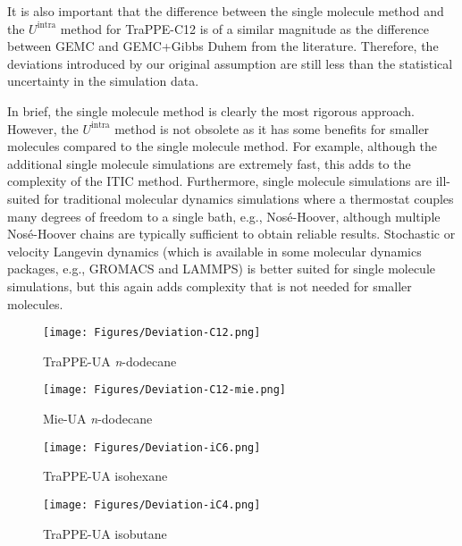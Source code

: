 \documentclass[%
 aip,
 jcp,
 sd,%
 amsmath,amssymb,
]{revtex4-1}
\begin{document}
It is also important that the difference between the single molecule method and the $U^\mathrm{intra}$ method for TraPPE-C12 is of a similar magnitude as the difference between GEMC and GEMC+Gibbs Duhem from the literature. Therefore, the deviations introduced by our original assumption are still less than the statistical uncertainty in the simulation data.

In brief, the single molecule method is clearly the most rigorous approach. However, the $U^\mathrm{intra}$ method is not obsolete as it has some benefits for smaller molecules compared to the single molecule method. For example, although the additional single molecule simulations are extremely fast, this adds to the complexity of the ITIC method. Furthermore, single molecule simulations are ill-suited for traditional molecular dynamics simulations where a thermostat couples many degrees of freedom to a single bath, e.g., Nos{\'e}-Hoover, although multiple Nos{\'e}-Hoover chains are typically sufficient to obtain reliable results. Stochastic or velocity Langevin dynamics (which is available in some molecular dynamics packages, e.g., GROMACS and LAMMPS) is better suited for single molecule simulations, but this again adds complexity that is not needed for smaller molecules. 
 
\begin{figure*}
\centering
\texttt{[image: Figures/Deviation-C12.png]}
\caption{
TraPPE-UA \textit{n}-dodecane
}
\label{fig:Deviation-C12}
\end{figure*}

\begin{figure*}
\centering
\texttt{[image: Figures/Deviation-C12-mie.png]}
\caption{
Mie-UA \textit{n}-dodecane
}
\label{fig:Deviation-C12-mie}
\end{figure*}

\begin{figure*}
\centering
\texttt{[image: Figures/Deviation-iC6.png]}
\caption{
TraPPE-UA isohexane
}
\label{fig:Deviation-iC6}
\end{figure*}

\begin{figure*}
\centering
\texttt{[image: Figures/Deviation-iC4.png]}
\caption{
TraPPE-UA isobutane
}
\label{fig:Deviation-iC4}
\end{figure*}






\newpage%
\clearpage

\end{document}
